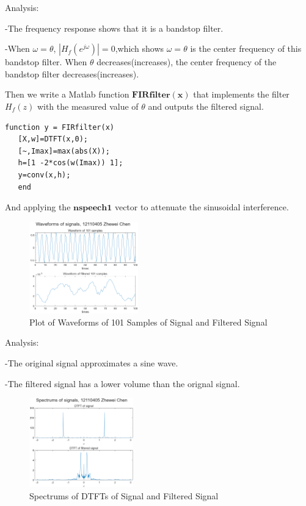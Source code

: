 \documentclass[journal]{IEEEtran}
\begin{document}
\textcolor[rgb]{0,0.6,1}{Analysis:}

\textcolor[rgb]{0,0.6,1}{-}The frequency response shows that it is a bandstop filter.

\textcolor[rgb]{0,0.6,1}{-}When \( \omega=\theta \),  \(|H_f(e^{j\omega})|=0\),which shows \( \omega=\theta \) is the center frequency of this bandstop filter.
When \(\theta\) decreases(increases), the center frequency of the bandstop filter decreases(increases).


Then we write a Matlab function \(\mathbf{FIRfilter(x)}\) that implements the filter \(H_f(z)\) with the measured value of \(\theta\) and outputs the filtered signal.

 \begin{lstlisting}[title={FIRfilter.m},style=Matlab-editor]
   function y = FIRfilter(x)
   [X,w]=DTFT(x,0);
   [~,Imax]=max(abs(X));
   h=[1 -2*cos(w(Imax)) 1];
   y=conv(x,h);
   end   
\end{lstlisting}

And applying the \(\mathbf{nspeech1} \) vector to attenuate the sinusoidal interference. 

 \begin{figure}[H]
   \centering
   \includegraphics[width=0.42\textwidth]{33.png} %
\caption{Plot of Waveforms of 101 Samples of Signal and Filtered Signal}
 \end{figure}

 \textcolor[rgb]{0,0.6,1}{Analysis:}


 \textcolor[rgb]{0,0.6,1}{-}The original signal approximates a sine wave.

 \textcolor[rgb]{0,0.6,1}{-}The filtered signal has a lower volume than the orignal signal.

 \begin{figure}[H]
   \centering
   \includegraphics[width=0.4\textwidth]{32.png} %
\caption{Spectrums of DTFTs of Signal and Filtered Signal}
 \end{figure}
\end{document}
